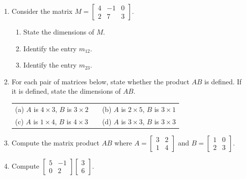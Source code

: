 \documentclass[10pt]{article}
\begin{document}
\namedateperiod

\vspace{0.12in}

\begin{enumerate}[leftmargin=1.6em, itemsep=14pt]

\item Consider the matrix $M = \begin{bmatrix}4 & -1 & 0 \\ 2 & 7 & 3\end{bmatrix}$.
\begin{enumerate}[label=(\alph*), itemsep=6pt]
  \item State the dimensions of $M$.
  \item Identify the entry $m_{12}$.
  \item Identify the entry $m_{23}$.
\end{enumerate}

\vspace{0.8in}

\item For each pair of matrices below, state whether the product $AB$ is defined.
If it is defined, state the dimensions of $AB$.

\medskip
\begin{tabular}{@{}lll@{}}
  (a) $A$ is $4\times 3$, $B$ is $3\times 2$ &\qquad&
  (b) $A$ is $2\times 5$, $B$ is $3\times 1$ \\[4pt]
  (c) $A$ is $1\times 4$, $B$ is $4\times 3$ &&
  (d) $A$ is $3\times 3$, $B$ is $3\times 3$
\end{tabular}

\vspace{1.0in}

\item Compute the matrix product $AB$ where
$A = \begin{bmatrix}3 & 2 \\ 1 & 4\end{bmatrix}$ and
$B = \begin{bmatrix}1 & 0 \\ 2 & 3\end{bmatrix}$.

\vspace{1.8in}

\item Compute
$\begin{bmatrix}5 & -1 \\ 0 & 2\end{bmatrix}\begin{bmatrix}3 \\ 6\end{bmatrix}$.


\end{enumerate}
\end{document}
